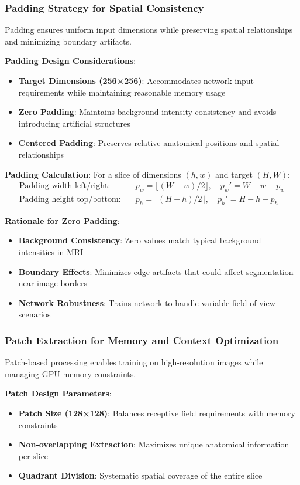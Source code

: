 \documentclass[12pt,a4paper]{article}
\begin{document}
\subsubsection{Padding Strategy for Spatial Consistency}

Padding ensures uniform input dimensions while preserving spatial relationships and minimizing boundary artifacts.

\textbf{Padding Design Considerations}:
\begin{itemize}
    \item \textbf{Target Dimensions (256×256)}: Accommodates network input requirements while maintaining reasonable memory usage
    \item \textbf{Zero Padding}: Maintains background intensity consistency and avoids introducing artificial structures
    \item \textbf{Centered Padding}: Preserves relative anatomical positions and spatial relationships
\end{itemize}

\textbf{Padding Calculation}:
For a slice of dimensions $(h, w)$ and target $(H, W)$:
\begin{align}
\text{Padding width left/right}: & \quad p_w = \lfloor (W - w)/2 \rfloor, \quad p_w' = W - w - p_w \\
\text{Padding height top/bottom}: & \quad p_h = \lfloor (H - h)/2 \rfloor, \quad p_h' = H - h - p_h
\end{align}

\textbf{Rationale for Zero Padding}:
\begin{itemize}
    \item \textbf{Background Consistency}: Zero values match typical background intensities in MRI
    \item \textbf{Boundary Effects}: Minimizes edge artifacts that could affect segmentation near image borders
    \item \textbf{Network Robustness}: Trains network to handle variable field-of-view scenarios
\end{itemize}

\subsubsection{Patch Extraction for Memory and Context Optimization}

Patch-based processing enables training on high-resolution images while managing GPU memory constraints.

\textbf{Patch Design Parameters}:
\begin{itemize}
    \item \textbf{Patch Size (128×128)}: Balances receptive field requirements with memory constraints
    \item \textbf{Non-overlapping Extraction}: Maximizes unique anatomical information per slice
    \item \textbf{Quadrant Division}: Systematic spatial coverage of the entire slice
\end{itemize}
\end{document}
